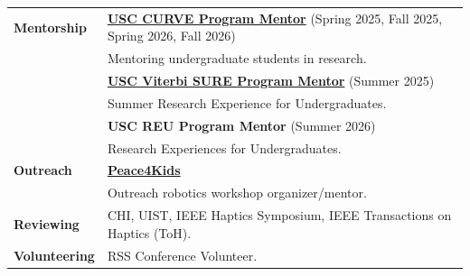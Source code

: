 \documentclass[12pt, letterpaper]{article}
\newlength{\datecolwidth}
\begin{document}
\noindent
\begin{tabularx}{\textwidth}{@{}p{\datecolwidth} X@{}}
    
    \textbf{Mentorship} & \textbf{\href{https://viterbiundergrad.usc.edu/research/curve/}{USC CURVE Program Mentor}} (Spring 2025, Fall 2025, Spring 2026, Fall 2026) \\
    & Mentoring undergraduate students in research. \\[4pt]
    
    & \textbf{\href{https://viterbischool.usc.edu/sure/}{USC Viterbi SURE Program Mentor}} (Summer 2025) \\
    & Summer Research Experience for Undergraduates. \\[4pt]

    & \textbf{USC REU Program Mentor} (Summer 2026) \\
    & Research Experiences for Undergraduates. \\[6pt]

    \textbf{Outreach} & \textbf{\href{https://www.peace4kids.org/}{Peace4Kids}} \\
    & Outreach robotics workshop organizer/mentor. \\[6pt]

    \textbf{Reviewing} & CHI, UIST, IEEE Haptics Symposium, IEEE Transactions on Haptics (ToH). \\[4pt]

    \textbf{Volunteering} & RSS Conference Volunteer. \\
    
\end{tabularx}
\end{document}
